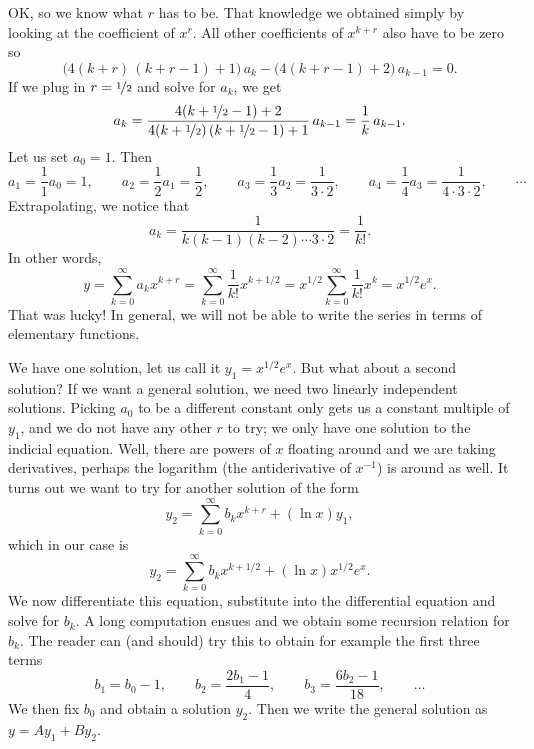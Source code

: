 \begin{example}
OK\@, so we know what $r$ has to be.  That knowledge we obtained simply by looking
at the coefficient of $x^r$.  All other
coefficients of $x^{k+r}$ also have to be zero so
\begin{equation*}
\bigl( 4 (k+r)\,(k+r-1) + 1 \bigr) \, a_k
-
\bigl( 4 (k+r-1) + 2 \bigr) \, a_{k-1} = 0 .
\end{equation*}
If we plug in $r=\nicefrac{1}{2}$ and solve for $a_k$, we get
\begin{equation*}
a_k
=
\frac{4 (k+\nicefrac{1}{2}-1) + 2}{4 (k+\nicefrac{1}{2})\,(k+\nicefrac{1}{2}-1) + 1} \, a_{k-1}
=
\frac{1}{k} \, a_{k-1} .
\end{equation*}
Let us set $a_0 = 1$.  Then
\begin{equation*}
a_1 = \frac{1}{1} a_0 = 1 ,
\qquad
a_2 = \frac{1}{2} a_1 = \frac{1}{2} ,
\qquad
a_3 = \frac{1}{3} a_2 = \frac{1}{3 \cdot 2} ,
\qquad
a_4 = \frac{1}{4} a_3 = \frac{1}{4 \cdot 3 \cdot 2} ,
\qquad \cdots
\end{equation*}
Extrapolating, we notice that
\begin{equation*}
a_k = \frac{1}{k(k-1)(k-2) \cdots 3 \cdot 2} = \frac{1}{k!} .
\end{equation*}
In other words,
\begin{equation*}
y = 
\sum_{k=0}^\infty a_k x^{k+r}
=
\sum_{k=0}^\infty \frac{1}{k!} x^{k+1/2}
=
x^{1/2}
\sum_{k=0}^\infty \frac{1}{k!} x^{k}
=
x^{1/2}
e^x .
\end{equation*}
That was lucky!  In general, we will not be able to write the series in
terms of elementary functions.

We have one solution, let us call it $y_1 = x^{1/2} e^x$.
But what about a second solution?  If
we want a general solution, we need two linearly independent solutions.
Picking $a_0$ to be a different constant only gets us a constant
multiple of $y_1$, and we do not have any other $r$ to try; we only
have one solution to the indicial equation.  Well, there are powers of $x$
floating around and we are taking derivatives, perhaps the logarithm (the
antiderivative of $x^{-1}$) is around as well.  It turns out we want to
try for another solution of the form
\begin{equation*}
y_2 = \sum_{k=0}^\infty b_k x^{k+r} + (\ln x) y_1 ,
\end{equation*}
which in our case is
\begin{equation*}
y_2 = \sum_{k=0}^\infty b_k x^{k+1/2} + (\ln x) x^{1/2} e^x .
\end{equation*}
We now differentiate this equation, substitute into the differential
equation and solve for $b_k$.  A long computation ensues and we
obtain some recursion relation for $b_k$.  The reader
can (and should) try this to obtain for example the first three terms
\begin{equation*}
b_1 = b_0 -1 , \qquad b_2 = \frac{2b_1-1}{4} , \qquad b_3 =
\frac{6b_2-1}{18} , \qquad \ldots
\end{equation*}
We then fix $b_0$ and obtain a solution $y_2$.  Then
we write the general solution as $y = A y_1 + B y_2$.
\end{example}

